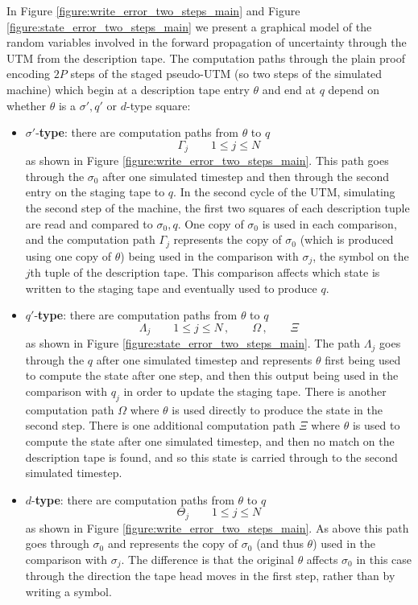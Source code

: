 \documentclass[english,letter paper,12pt,reqno]{article}
\theoremstyle{definition}
\def\be{\begin{equation}}
\def\ee{\end{equation}}
\begin{document}
In Figure \ref{figure:write_error_two_steps_main} and Figure \ref{figure:state_error_two_steps_main} we present a graphical model of the random variables involved in the forward propagation of uncertainty through the UTM from the description tape. The computation paths through the plain proof encoding $2P$ steps of the staged pseudo-UTM (so two steps of the simulated machine) which begin at a description tape entry $\theta$ and end at $q$ depend on whether $\theta$ is a $\sigma',q'$ or $d$-type square:
\begin{itemize}
    \item $\sigma'$-\textbf{type}: there are computation paths from $\theta$ to $q$
    \be
    \Gamma_j \qquad 1 \le j \le N
    \ee
    as shown in Figure \ref{figure:write_error_two_steps_main}. This path goes through the $\sigma_0$ after one simulated timestep and then through the second entry on the staging tape to $q$. In the second cycle of the UTM, simulating the second step of the machine, the first two squares of each description tuple are read and compared to $\sigma_0, q$. One copy of $\sigma_0$ is used in each comparison, and the computation path $\Gamma_j$ represents the copy of $\sigma_0$ (which is produced using one copy of $\theta$) being used in the comparison with $\sigma_j$, the symbol on the $j$th tuple of the description tape. This comparison affects which state is written to the staging tape and eventually used to produce $q$.
    \item $q'$-\textbf{type}: there are computation paths from $\theta$ to $q$
    \be
    \Lambda_j \qquad 1 \le j \le N\,, \qquad \Omega\,, \qquad \Xi
    \ee
    as shown in Figure \ref{figure:state_error_two_steps_main}. The path $\Lambda_j$ goes through the $q$ after one simulated timestep and represents $\theta$ first being used to compute the state after one step, and then this output being used in the comparison with $q_j$ in order to update the staging tape. There is another computation path $\Omega$ where $\theta$ is used directly to produce the state in the second step. There is one additional computation path $\Xi$ where $\theta$ is used to compute the state after one simulated timestep, and then no match on the description tape is found, and so this state is carried through to the second simulated timestep.
    \item $d$-\textbf{type}: there are computation paths from $\theta$ to $q$
    \be
    \Theta_j \qquad 1 \le j \le N
    \ee
    as shown in Figure \ref{figure:write_error_two_steps_main}. As above this path goes through $\sigma_0$ and represents the copy of $\sigma_0$ (and thus $\theta$) used in the comparison with $\sigma_j$. The difference is that the original $\theta$ affects $\sigma_0$ in this case through the direction the tape head moves in the first step, rather than by writing a symbol.
\end{itemize}
\end{document}
